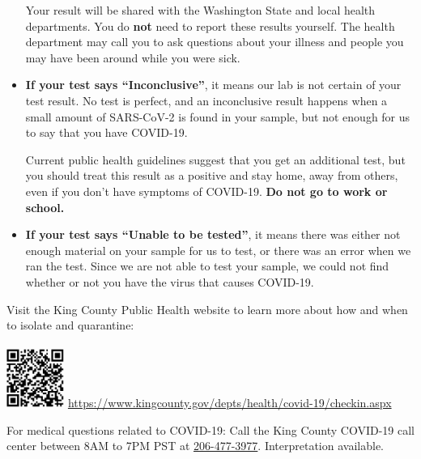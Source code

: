 \documentclass[10pt]{article}
\begin{document}
\begin{itemize}
  Your result will be shared with the Washington State and local health
  departments. You do \textbf{not} need to report these results yourself. The
  health department may call you to ask questions about your illness and people
  you may have been around while you were sick.

\item

  \textbf{If your test says ``Inconclusive''}, it means our lab is not certain
  of your test result. No test is perfect, and an inconclusive result happens
  when a small amount of SARS-CoV-2 is found in your sample, but not enough for
  us to say that you have COVID-19.

  Current public health guidelines suggest that you get an additional test, but
  you should treat this result as a positive and stay home, away from others,
  even if you don’t have symptoms of COVID-19. \textbf{Do not go to work or
  school.}

\item

  \textbf{If your test says ``Unable to be tested''}, it means there was either
  not enough material on your sample for us to test, or there was an error when
  we ran the test. Since we are not able to test your sample, we could not find
  whether or not you have the virus that causes COVID-19.

\end{itemize}

\bigskip

Visit the King County Public Health website to learn more about how and when to isolate and quarantine:\\\\
\includegraphics[height=0.75in,trim=0 0 0 0]{king_county_covid19_qr}
\qquad
\href{https://www.kingcounty.gov/depts/health/covid-19/checkin.aspx}{ https://www.kingcounty.gov/depts/health/covid-19/checkin.aspx}

For medical questions related to COVID-19:
Call the King County COVID-19 call center between 8AM to 7PM PST at \href{tel:+1-206-477-3977}{206-477-3977}.
Interpretation available.
\end{document}
